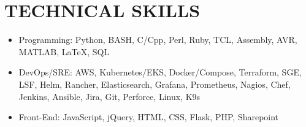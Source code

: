 \documentclass[line,margin]{res}
\begin{document}
\begin{resume}
\begin{adjustwidth}{-115pt}{0pt}

\end{adjustwidth}

\section{TECHNICAL SKILLS}
\vspace{25px}
\begin{adjustwidth}{-115pt}{0pt}
	\begin{itemize}
		\item Programming: Python, BASH, C/Cpp, Perl, Ruby, TCL, Assembly, AVR, MATLAB, \LaTeX, SQL
		\item DevOps/SRE: AWS, Kubernetes/EKS, Docker/Compose, Terraform, SGE, LSF, Helm, Rancher, Elasticsearch, Grafana, Prometheus, Nagios, Chef, Jenkins, Ansible, Jira, Git, Perforce, Linux, K9s
		\item Front-End: JavaScript, jQuery, HTML, CSS, Flask, PHP, Sharepoint
	\end{itemize}
\end{adjustwidth}


\end{resume}
\end{document}
